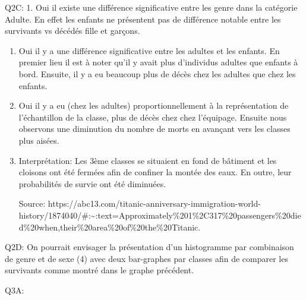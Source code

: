 \documentclass[
  letterpaper,
  DIV=11,
  numbers=noendperiod]{scrartcl}
\newenvironment{Shaded}{}{}
\newcommand{\AttributeTok}[1]{\textcolor[rgb]{0.84,0.23,0.29}{#1}}
\newcommand{\DecValTok}[1]{\textcolor[rgb]{0.00,0.36,0.77}{#1}}
\newcommand{\FunctionTok}[1]{\textcolor[rgb]{0.44,0.26,0.76}{#1}}
\newcommand{\NormalTok}[1]{\textcolor[rgb]{0.14,0.16,0.18}{#1}}
\newcommand{\SpecialCharTok}[1]{\textcolor[rgb]{0.00,0.36,0.77}{#1}}
\newcommand{\StringTok}[1]{\textcolor[rgb]{0.01,0.18,0.38}{#1}}
\begin{document}
Q2C: 1. Oui il existe une différence significative entre les genre dans
la catégorie Adulte. En effet les enfants ne présentent pas de
différence notable entre les survivants vs décédés fille et garçons.

\begin{enumerate}
\def\labelenumi{\arabic{enumi}.}
\setcounter{enumi}{1}
\item
  Oui il y a une différence significative entre les adultes et les
  enfants. En premier lieu il est à noter qu'il y avait plus d'individus
  adultes que enfants à bord. Ensuite, il y a eu beaucoup plus de décès
  chez les adultes que chez les enfants.
\item
  Oui il y a eu (chez les adultes) proportionnellement à la
  représentation de l'échantillon de la classe, plus de décès chez chez
  l'équipage. Ensuite nous observons une diminution du nombre de morts
  en avançant vers les classes plus aisées.
\item
  Interprétation: Les 3ème classes se situaient en fond de bâtiment et
  les cloisons ont été fermées afin de confiner la montée des eaux. En
  outre, leur probabilités de survie ont été diminuées.

  Source:
  https://abc13.com/titanic-anniversary-immigration-world-history/1874040/\#:\textasciitilde:text=Approximately\%201\%2C317\%20passengers\%20died\%20when,their\%20area\%20of\%20the\%20Titanic.
\end{enumerate}

Q2D: On pourrait envisager la présentation d'un histogramme par
combinaison de genre et de sexe (4) avec deux bar-graphes par classes
afin de comparer les survivants comme montré dans le graphe précédent.

Q3A:

\begin{Shaded}
\end{Shaded}
\end{document}
